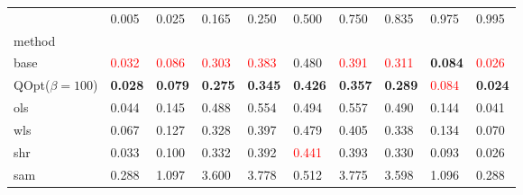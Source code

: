 \begin{tabular}{llllllllll}
\toprule
 & 0.005 & 0.025 & 0.165 & 0.250 & 0.500 & 0.750 & 0.835 & 0.975 & 0.995 \\
method &  &  &  &  &  &  &  &  &  \\
\midrule
base & \textcolor{red}{0.032} & \textcolor{red}{0.086} & \textcolor{red}{0.303} & \textcolor{red}{0.383} & 0.480 & \textcolor{red}{0.391} & \textcolor{red}{0.311} & \textbf{0.084} & \textcolor{red}{0.026} \\
\midrule
QOpt($\beta=100$) & \textbf{0.028} & \textbf{0.079} & \textbf{0.275} & \textbf{0.345} & \textbf{0.426} & \textbf{0.357} & \textbf{0.289} & \textcolor{red}{0.084} & \textbf{0.024} \\
ols & 0.044 & 0.145 & 0.488 & 0.554 & 0.494 & 0.557 & 0.490 & 0.144 & 0.041 \\
wls & 0.067 & 0.127 & 0.328 & 0.397 & 0.479 & 0.405 & 0.338 & 0.134 & 0.070 \\
shr & 0.033 & 0.100 & 0.332 & 0.392 & \textcolor{red}{0.441} & 0.393 & 0.330 & 0.093 & 0.026 \\
sam & 0.288 & 1.097 & 3.600 & 3.778 & 0.512 & 3.775 & 3.598 & 1.096 & 0.288 \\
\bottomrule
\end{tabular}